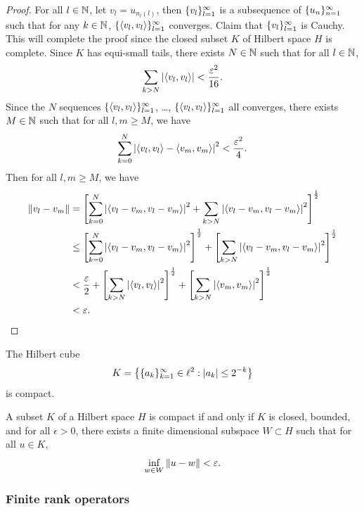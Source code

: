\documentclass[a4paper]{article}
\renewcommand{\braket}[2]{\left\langle #1, #1 \right\rangle}
\begin{document}
\begin{proof}
  For all $l \in \mathbb{N}$, let $v_l = u_{n_l(l)}$, then
  $\{ v_l \}_{l=1}^\infty$ is a subsequence of $\{ u_n \}_{n=1}^\infty$
  such that for any $k \in \mathbb{N}$,
  $\seqinfl{\braket{v_l}{e_k}}$ converges. Claim that
  $\{ v_l \}_{l=1}^\infty$ is Cauchy. This will complete the proof
  since the closed subset $K$ of Hilbert space $H$ is complete.
  Since $K$ has equi-small tails, there exists $N \in \mathbb{N}$
  such that for all $l \in \mathbb{N}$,
  \[
    \sum_{k > N} \abs{\braket{v_l}{e_k}} < \frac{\epsilon^2}{16}.
  \]
  Since the $N$ sequences $\seqinfl{\braket{v_l}{e_1}}$,
  \dots, $\seqinfl{\braket{v_l}{e_N}}$ all converges,
  there exists $M \in \mathbb{N}$ such that for all $l, m \geq M$,
  we have
  \[
    \sum_{k=0}^N \abs{\braket{v_l}{e_k} - \braket{v_m}{e_k}}^2
    < \frac{\epsilon^2}{4}.
  \]
  Then for all $l, m \geq M$, we have
  \[
    \begin{aligned}
      \norm{v_l - v_m}
       & =
      \left[ \sum_{k=0}^N \abs{\braket{v_l - v_m}{e_k}}^2
        + \sum_{k > N} \abs{\braket{v_l - v_m}{e_k}}^2 \right]^{\frac{1}{2}}                          \\
       & \leq
      \left[ \sum_{k=0}^N \abs{\braket{v_l - v_m}{e_k}}^2  \right]
      ^{\frac{1}{2}}
      + \left[ \sum_{k > N} \abs{\braket{v_l - v_m}{e_k}}^2 \right]
        ^{\frac{1}{2}}                                    \\
       & < \frac{\epsilon}{2} + \left[ \sum_{k > N} \abs{\braket{v_l}{e_m}}^2 \right]
                                ^{\frac{1}{2}} + \left[ \sum_{k > N} \abs{\braket{v_m}{e_k}}^2 \right]
                                                 ^{\frac{1}{2}} \\
       & < \epsilon.
    \end{aligned}
  \]
\end{proof}

\begin{eg}
  The Hilbert cube
  \[
    K = \left\{ \{ a_k \}_{k=1}^\infty \in \ell^2 : \left\lvert a_k\right\rvert \leq 2^{-k} \right\}
  \]
  is compact.
\end{eg}

\begin{thm}
  A subset $K$ of a Hilbert space $H$ is compact
  if and only if $K$ is closed, bounded, and for
  all $\epsilon > 0$, there exists a finite dimensional subspace
  $W \subset H$ such that for all $u \in K$,
  \[
    \inf_{w \in W} \left\lVert u - w\right\rVert < \varepsilon.
  \]
\end{thm}

\subsubsection*{Finite rank operators}
\end{document}
